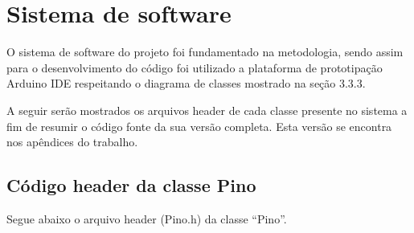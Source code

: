 %
%


\section{Sistema de software}\label{sec:ressissof}

O sistema de software do projeto foi fundamentado na metodologia, sendo assim para o desenvolvimento 
do código foi utilizado a plataforma de prototipação Arduino IDE respeitando o diagrama de classes 
mostrado na seção 3.3.3.

A seguir serão mostrados os arquivos header de cada classe presente no sistema a fim de resumir 
o código fonte da sua versão completa. Esta versão se encontra nos apêndices do trabalho.

\subsection{Código header da classe Pino}\label{subsec:respino}

Segue abaixo o arquivo header (Pino.h) da classe “Pino”.

